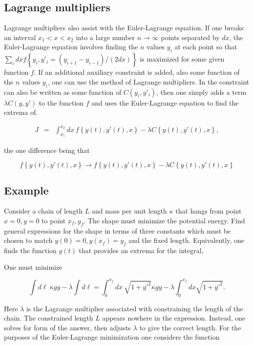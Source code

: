 \documentclass[%
oneside,                 %
final,                   %
10pt]{article}
\begin{document}
\subsection*{Lagrange multipliers}

Lagrange multipliers also assist with the Euler-Lagrange equation. If
one breaks an interval $x_1<x<x_2$ into a large number
$n\rightarrow\infty$ points separated by $dx$, the Euler-Lagrange
equation involves finding the $n$ values $y_i$ at each point so that
$\sum_i dx f\left\{y_i,y'_i=(y_{i+1}-y_{i-1})/(2dx)\right\}$ is
maximized for some given function $f$. If an additional auxiliary
constraint is added, also some function of the $n$ values $y_i$, one
can use the method of Lagrange multipliers. In the constraint can also
be written as some function of $C(y_i,y'_i)$, then one simply adds a
term $\lambda C(y,y')$ to the function $f$ and uses the Euler-Lagrange
equation to find the extrema of.

\begin{eqnarray}
J&=&\int_{x_1}^{x_2}dx~f\left\{y(t),y'(t),x\right\}-\lambda C\left\{y(t),y'(t),x\right\},
\end{eqnarray}

the one difference being that

\begin{equation}
f\left\{y(t),y'(t),x\right\}\rightarrow f\left\{y(t),y'(t),x\right\}-\lambda C\left\{y(t),y'(t),x\right\}
\end{equation}

\subsection*{Example}

Consider a chain of length $L$ and mass per unit length $\kappa$ that
hangs from point $x=0,y=0$ to point $x_f,y_f$. The shape must minimize
the potential energy. Find general expressions for the shape in terms
of three constants which must be chosen to match $y(0)=0, y(x_f)=y_f$
and the fixed length. Equivalently, one finds the function $y(t)$ that
provides an extrema for the integral,

One must minimize

\[
\int d\ell~\kappa gy-\lambda\int d\ell=
\int_0^{x_f} dx~\sqrt{1+y'^2}\kappa gy-\lambda \int_0^{x_f} dx\sqrt{1+y'^2}.
\]

Here $\lambda$ is the Lagrange multiplier associated with constraining
the length of the chain. The constrained length $L$ appears nowhere in
the expression. Instead, one solves for form of the answer, then
adjusts $\lambda$ to give the correct length. For the purposes of the
Euler-Lagrange minimization one considers the function
\end{document}

